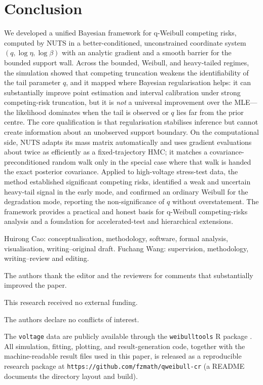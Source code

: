 \documentclass[ASNA,twocolumn]{USG}
\begin{document}
\section{Conclusion}\label{sec:concl}
We developed a unified Bayesian framework for q-Weibull competing risks,
computed by NUTS in a better-conditioned, unconstrained coordinate
system $(q,\log\eta,\log\beta)$ with an analytic gradient and a smooth barrier for
the bounded support wall. Across the bounded, Weibull, and heavy-tailed regimes, the simulation
showed that competing truncation weakens the identifiability of the tail
parameter $q$, and it mapped where Bayesian regularisation helps: it can
substantially improve point estimation and interval calibration under strong
competing-risk truncation, but it is \emph{not} a universal improvement over
the MLE---the likelihood dominates when the tail is observed or $q$ lies far
from the prior centre. The core qualification is that regularisation
stabilises inference but cannot create information about an unobserved
support boundary. On
the computational side, NUTS adapts its mass matrix automatically and
uses gradient evaluations about twice as efficiently as a
fixed-trajectory HMC; it matches a covariance-preconditioned random walk
only in the special case where that walk is handed the exact posterior
covariance.
Applied to high-voltage stress-test
data, the method established significant competing risks, identified a weak
and uncertain heavy-tail signal in the early mode, and confirmed an
ordinary Weibull for the degradation mode, reporting the non-significance
of $q$ without overstatement. The framework provides a practical and honest
basis for q-Weibull competing-risks analysis and a foundation for
accelerated-test and hierarchical extensions.

Huirong Cao: conceptualisation, methodology, software, formal analysis,
visualisation, writing--original draft. Fuchang Wang: supervision,
methodology, writing--review and editing.

The authors thank the editor and the reviewers for comments that
substantially improved the paper.

This research received no external funding.

The authors declare no conflicts of interest.

The \texttt{voltage} data are publicly available through the
\texttt{weibulltools} R package \cite{weibulltools}. All simulation,
fitting, plotting, and result-generation code, together with the
machine-readable result files used in this paper, is released as a
reproducible research package at
\texttt{https://github.com/fzmath/qweibull-cr} (a README documents the
directory layout and build).
\end{document}
